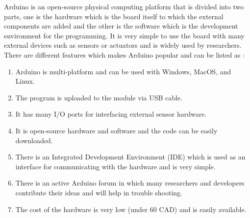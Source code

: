 Arduino is an open-source physical computing platform that is divided into two parts, one is the hardware which is the board itself to which the external components are added and the other is the software which is the development environment for the programming. It is very simple to use the board with many external devices such as sensors or actuators and is widely used by researchers. There are different features which makes Arduino popular and can be listed as \cite{Banzi2008}:


\begin{enumerate}


  \item  Arduino is multi-platform and can be used with Windows, MacOS, and Linux.

  \item The program is uploaded to the module via USB cable.
  \item It has many I/O ports for interfacing external sensor hardware.

  \item It is open-source hardware and software and the code can be easily downloaded.
  
  \item There is an Integrated Development Environment (IDE) which is used as an interface for communicating with the hardware and is very simple.
  
  \item There is an active Arduino forum in which many researchers and developers contribute their ideas and will help in trouble shooting.
  
  \item The cost of the hardware is very low (under 60 CAD) and is easily available.
  
\end{enumerate}


